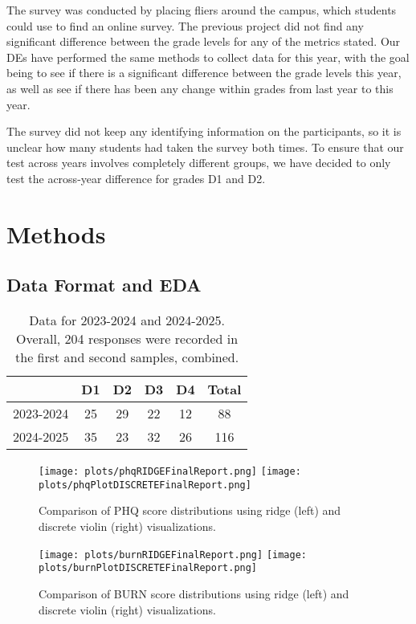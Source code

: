 \documentclass{article}
\begin{document}
The survey was conducted by placing fliers around the campus, which students could use to find an online survey. The previous project did not find any significant difference between the grade levels for any of the metrics stated. Our DEs have performed the same methods to collect data for this year, with the goal being to see if there is a significant difference between the grade levels this year, as well as see if there has been any change within grades from last year to this year.

The survey did not keep any identifying information on the participants, so it is unclear how many students had taken the survey both times. To ensure that our test across years involves completely different groups, we have decided to only test the across-year difference for grades D1 and D2.


\section{Methods}
\subsection{Data Format and EDA}

\begin{table}[H]
    \centering
    \begin{tabular}{lccccc}
    \hline
     & D1 & D2 & D3 & D4 & Total \\
    \hline
    2023-2024 & 25 & 29 & 22 & 12 & 88 \\
    2024-2025 & 35 & 23 & 32 & 26 & 116 \\
    \hline
    \end{tabular}
    \caption{Data for 2023-2024 and 2024-2025. Overall, 204 responses were recorded in the first and second samples, combined.}
    \label{tab:yearly_data}
\end{table}


\begin{figure}[H]
    \centering
    \texttt{[image: plots/phqRIDGEFinalReport.png]}
    \hfill
    \texttt{[image: plots/phqPlotDISCRETEFinalReport.png]}
    \caption{Comparison of PHQ score distributions using ridge (left) and discrete violin (right) visualizations.}
    \label{fig:phq_dist_compare}
\end{figure}

\begin{figure}[H]
    \centering
    \texttt{[image: plots/burnRIDGEFinalReport.png]}
    \hfill
    \texttt{[image: plots/burnPlotDISCRETEFinalReport.png]}
    \caption{Comparison of BURN score distributions using ridge (left) and discrete violin (right) visualizations.}
    \label{fig:burn_dist_compare}
\end{figure}
\end{document}
